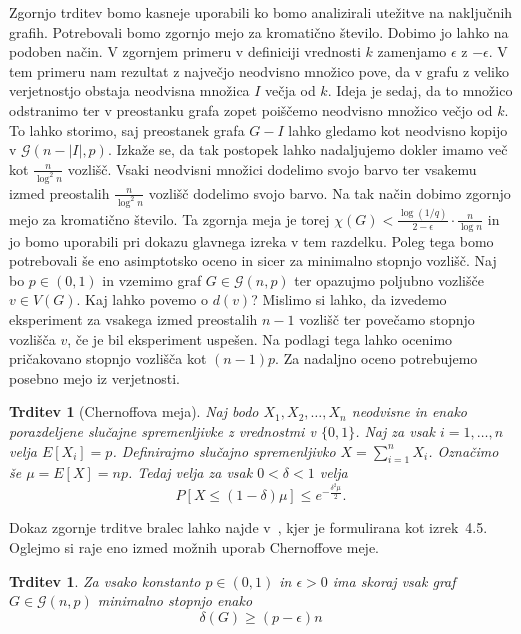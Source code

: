 \documentclass[12pt,a4paper,twoside]{article}
\theoremstyle{definition} %
\theoremstyle{plain} %
\newtheorem{trditev}[definicija]{Trditev}
\numberwithin{equation}{section}  %
\begin{document}
Zgornjo trditev bomo kasneje uporabili ko bomo analizirali utežitve na naključnih grafih. Potrebovali bomo zgornjo mejo za kromatično število. Dobimo jo lahko na podoben način. V zgornjem primeru v definiciji vrednosti $k$ zamenjamo $\epsilon$ z $-\epsilon$. V tem primeru nam rezultat z največjo neodvisno množico pove, da v grafu z veliko verjetnostjo obstaja neodvisna množica $I$ večja od $k$. Ideja je sedaj, da to množico odstranimo ter v preostanku grafa zopet poiščemo neodvisno množico večjo od $k$. To lahko storimo, saj preostanek grafa $G - I$ lahko gledamo kot neodvisno kopijo v $\mathcal{G}(n - |I|, p)$. Izkaže se, da tak postopek lahko nadaljujemo dokler imamo več kot $\frac{n}{\log^2n}$ vozlišč. Vsaki neodvisni množici dodelimo svojo barvo ter vsakemu izmed preostalih $\frac{n}{\log^2n}$ vozlišč dodelimo svojo barvo. Na tak način dobimo zgornjo mejo za kromatično število. Ta zgornja meja je torej $\chi(G) < \frac{\log(1/q)}{2 - \epsilon} \cdot \frac{n}{\log n}$ in jo bomo uporabili pri dokazu glavnega izreka v tem razdelku. Poleg tega bomo potrebovali še eno asimptotsko oceno in sicer za minimalno stopnjo vozlišč. Naj bo $p \in (0, 1)$ in vzemimo graf $G \in  \mathcal{G}(n, p)$ ter opazujmo poljubno vozlišče $v \in V(G)$. Kaj lahko povemo o $d(v)$? Mislimo si lahko, da izvedemo eksperiment za vsakega izmed preostalih $n - 1$ vozlišč ter povečamo stopnjo vozlišča $v$, če je bil eksperiment uspešen. Na podlagi tega lahko ocenimo pričakovano stopnjo vozlišča kot $(n-1)p$. Za nadaljno oceno potrebujemo posebno mejo iz verjetnosti.
\begin{trditev}[Chernoffova meja]
Naj bodo $X_1, X_2, \ldots, X_n$ neodvisne in enako porazdeljene slučajne spremenljivke z vrednostmi v $\{0, 1\}$. Naj za vsak $i = 1, \ldots, n$ velja $E[X_i] = p$. Definirajmo slučajno spremenljivko $X = \sum_{i=1}^n X_i$. Označimo še $\mu = E[X] = np$. Tedaj velja za vsak $0 <\delta < 1$ velja
$$P[X \le (1-\delta) \mu] \le e ^{-\frac{\delta^2 \mu}{2}}. $$


\end{trditev}
Dokaz zgornje trditve bralec lahko najde v~\cite{chernov}, kjer je formulirana kot izrek~4.5. Oglejmo si raje eno izmed možnih uporab Chernoffove meje.
\begin{trditev}
Za vsako konstanto $p \in(0,1)$ in $\epsilon > 0$ ima skoraj vsak graf $G \in \mathcal{G}(n, p)$ minimalno stopnjo enako
$$\delta(G) \ge (p - \epsilon)n  $$
\end{trditev}
\end{document}

